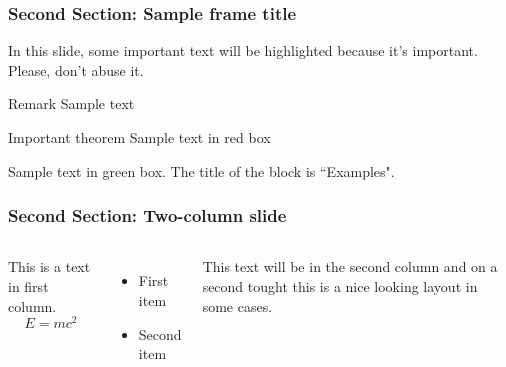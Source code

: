 \documentclass{beamer}
\newcommand{\secondSec}{Second Section}
\begin{document}
    \begin{frame}
      \frametitle{\secondSec: Sample frame title}
      In this slide, some important text will be
      \alert{highlighted} because it's important.
      Please, don't abuse it.

      \begin{block}{Remark}
        Sample text
      \end{block}
      
      \begin{alertblock}{Important theorem}
        Sample text in red box
      \end{alertblock}
      
      \begin{examples}
        Sample text in green box. The title of the block is ``Examples".
      \end{examples}
    \end{frame}


    \begin{frame}
      \frametitle{\secondSec: Two-column slide}
      \begin{columns}
          This is a text in first column.
          $$E=mc^2$$
          \begin{itemize}
            \item First item
            \item Second item
          \end{itemize}

          This text will be in the second column
          and on a second tought this is a nice looking
          layout in some cases.
      \end{columns}
    \end{frame}
\end{document}
